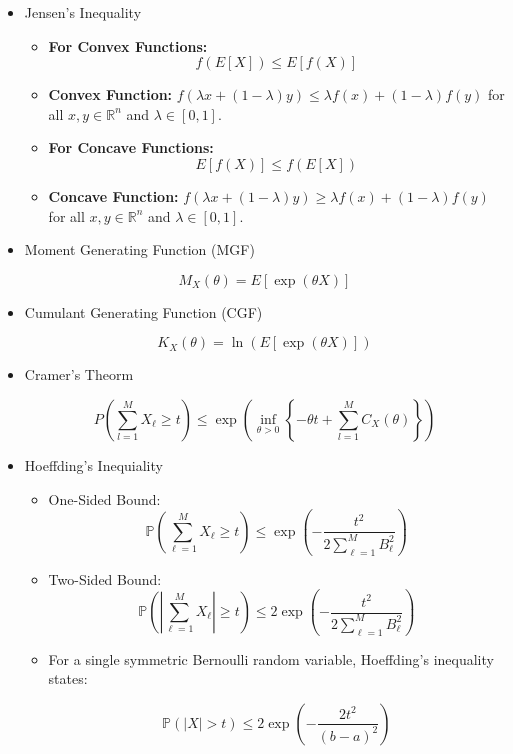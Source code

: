 \documentclass{article}
\begin{document}
\begin{itemize}
\item Jensen's Inequality

\begin{itemize}
    \item \textbf{For Convex Functions:} 
    \[
    f(E[X]) \leq E[f(X)]
    \]
    \item \textbf{Convex Function:} \( f(\lambda x + (1 - \lambda)y) \leq \lambda f(x) + (1 - \lambda)f(y) \) for all \( x, y \in \mathbb{R}^n \) and \( \lambda \in [0, 1]. \)

    \item \textbf{For Concave Functions:} 
    \[
    E[f(X)] \leq f(E[X])
    \]
    \item \textbf{Concave Function:} \( f(\lambda x + (1 - \lambda)y) \geq \lambda f(x) + (1 - \lambda)f(y) \) for all \( x, y \in \mathbb{R}^n \) and \( \lambda \in [0, 1]. \)
\end{itemize}


\item Moment Generating Function (MGF)

\[
M_X(\theta) = E[\exp(\theta X)]
\]

\item Cumulant Generating Function (CGF)

\[
K_X(\theta) = \ln(E[\exp(\theta X)])
\]

\item Cramer's Theorm

\[
P\left(\sum_{l=1}^{M} X_\ell \geq t\right) \leq \exp\left(\inf_{\theta > 0}\left\{-\theta t + \sum_{l=1}^{M} C_X(\theta)\right\}\right)
\]

\item Hoeffding's Inequiality

\begin{itemize}

\item One-Sided Bound:
    \[
    \mathbb{P}\left(\sum_{\ell=1}^{M} X_\ell \geq t\right) \leq \exp\left(-\frac{t^2}{2\sum_{\ell=1}^{M} B_\ell^2}\right)
    \]

    \item Two-Sided Bound:
    \[
    \mathbb{P}\left(\left|\sum_{\ell=1}^{M} X_\ell\right| \geq t\right) \leq 2 \exp\left(-\frac{t^2}{2\sum_{\ell=1}^{M} B_\ell^2}\right)
    \]

    \item For a single symmetric Bernoulli random variable, Hoeffding's inequality states:

\[
\mathbb{P} \left( |X| > t \right) \leq 2 \exp \left( -\frac{2t^2}{(b-a)^2} \right)
\]


\end{itemize}
\end{itemize}
\end{document}
